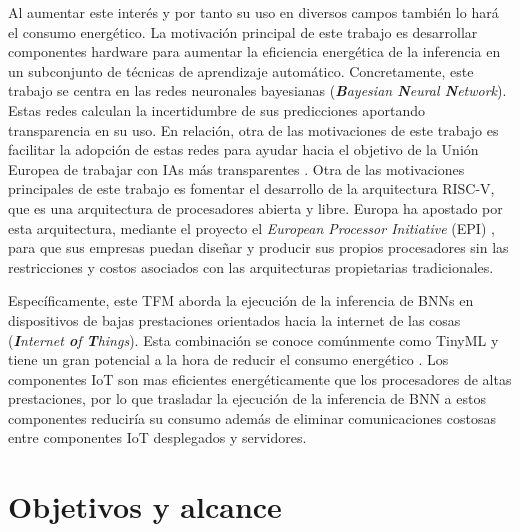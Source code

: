 Al aumentar este interés y por tanto su uso en diversos campos también lo hará el consumo energético. La motivación principal de este trabajo es desarrollar componentes hardware para aumentar la eficiencia energética de la inferencia en un subconjunto de técnicas de aprendizaje automático. Concretamente, este trabajo se centra en las redes neuronales bayesianas (\textit{\textbf{B}ayesian \textbf{N}eural \textbf{N}etwork}). Estas redes calculan la incertidumbre de sus predicciones aportando transparencia en su uso. En relación, otra de las motivaciones de este trabajo es facilitar la adopción de estas redes para ayudar hacia el objetivo de la Unión Europea de trabajar con IAs más transparentes \cite{eu_ai}. Otra de las motivaciones principales de este trabajo es fomentar el desarrollo de la arquitectura RISC-V, que es una arquitectura de procesadores abierta y libre. Europa ha apostado por esta arquitectura, mediante el proyecto el \textit{European Processor Initiative} (EPI) \cite{european_processor}, para que sus empresas puedan diseñar y producir sus propios procesadores sin las restricciones y costos asociados con las arquitecturas propietarias tradicionales. 

Específicamente, este TFM aborda la ejecución de la inferencia de BNNs en dispositivos de bajas prestaciones orientados hacia la internet de las cosas (\textit{\textbf{I}nternet \textbf{o}f \textbf{T}hings}). Esta combinación se conoce comúnmente como TinyML y tiene un gran potencial a la hora de reducir el consumo energético \cite{tinyML_sustainable}. Los componentes IoT son mas eficientes energéticamente que los procesadores de altas prestaciones, por lo que trasladar la ejecución de la inferencia de BNN a estos componentes reduciría su consumo además de eliminar comunicaciones costosas entre componentes IoT desplegados y servidores.

\section{Objetivos y alcance}

